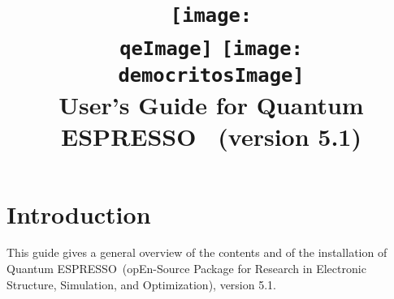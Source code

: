 \documentclass[12pt,a4paper]{article}
\def\version{5.1}
\def\qe{{\sc Quantum ESPRESSO}}
\begin{document}
 
\author{}
\date{}

\def\qeImage{quantum_espresso.pdf}
\def\democritosImage{democritos.pdf}

\begin{htmlonly}
\def\qeImage{quantum_espresso.png}
\def\democritosImage{democritos.png}
\end{htmlonly}

\title{
  \texttt{[image: \\qeImage]} \hskip 2cm
  \texttt{[image: \\democritosImage]}\\
  \vskip 1cm
  \Huge User's Guide for \qe\ \smallskip
  \Large (version \version)
}


\maketitle

\tableofcontents

\section{Introduction}

This guide gives a general overview of the contents and of the installation 
of \qe\ (opEn-Source Package for Research in Electronic Structure, Simulation,
and Optimization), version \version.
\end{document}
